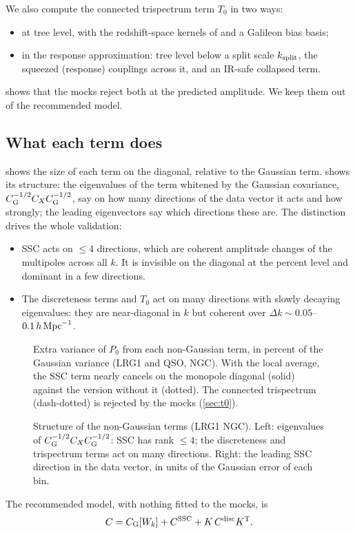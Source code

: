 We also compute the connected trispectrum term $T_0$ in two ways:
\begin{itemize}
\item at tree level, with the redshift-space kernels of \cite{SCF1999} and a Galileon bias basis;
\item in the response approximation: tree level below a split scale $k_{\rm split}$, the squeezed (response) couplings across it, and an IR-safe collapsed term.
\end{itemize}
 shows that the mocks reject both at the predicted amplitude. We keep them out of the recommended model.

\subsection{What each term does}

 shows the size of each term on the diagonal, relative to the Gaussian term.  shows its structure: the eigenvalues of the term whitened by the Gaussian covariance, $C_{\rm G}^{-1/2}C_XC_{\rm G}^{-1/2}$, say on how many directions of the data vector it acts and how strongly; the leading eigenvectors say which directions these are. The distinction drives the whole validation:
\begin{itemize}
\item SSC acts on $\le4$ directions, which are coherent amplitude changes of the multipoles across all $k$. It is invisible on the diagonal at the percent level and dominant in a few directions.
\item The discreteness terms and $T_0$ act on many directions with slowly decaying eigenvalues: they are near-diagonal in $k$ but coherent over $\Delta k\sim0.05$--$0.1\,h\,\mathrm{Mpc}^{-1}$.
\end{itemize}

\begin{figure}
  \centering{}
  \caption{Extra variance of $P_0$ from each non-Gaussian term, in percent of the Gaussian variance (LRG1 and QSO, NGC). With the local average, the SSC term nearly cancels on the monopole diagonal (solid) against the version without it (dotted). The connected trispectrum (dash-dotted) is rejected by the mocks (\cref{sec:t0}).}
  \label{fig:budget}
\end{figure}

\begin{figure}
  \centering{}
  \caption{Structure of the non-Gaussian terms (LRG1 NGC). Left: eigenvalues of $C_{\rm G}^{-1/2}C_XC_{\rm G}^{-1/2}$: SSC has rank $\le4$; the discreteness and trispectrum terms act on many directions. Right: the leading SSC direction in the data vector, in units of the Gaussian error of each bin.}
  \label{fig:anatomy}
\end{figure}

The recommended model, with nothing fitted to the mocks, is
\begin{equation}
  C = C_{\rm G}[W_k] + C^{\rm SSC} + K\,C^{\rm disc}K^{\rm T}.
\end{equation}
